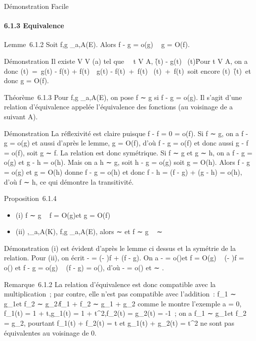 \documentclass[]{article}
\begin{document}
Démonstration Facile

\paragraph{6.1.3 Equivalence}

Lemme~6.1.2 Soit f,g _a,A(E). Alors f - g = o(g) \rigtharrow~ g = O(f).

Démonstration Il existe V \in V (a) tel que \forall~~t \in
V \bigcap A, \f(t) - g(t)\
 
\g(t)\. Pour t \in V \bigcap
A, on a donc \g(t)\
=(t) - f(t) + f(t)\
\leq{}(t) - f(t)\
+\ f(t)\ 
\over 2
\g(t)\
+\ f(t)\ soit encore
\g(t)\ \f(t)\, et donc g =
O(f).

Théorème~6.1.3 Pour f,g _a,A(E), on pose f ∼ g si f - g =
o(g). Il s'agit d'une relation d'équivalence appelée l'équivalence des
fonctions (au voisinage de a suivant A).

Démonstration La réflexivité est claire puisque f - f = 0 = o(f). Si f ∼
g, on a f - g = o(g) et aussi d'après le lemme, g = O(f), d'où f - g =
o(f) et donc aussi g - f = o(f), soit g ∼ f. La relation est donc
symétrique. Si f ∼ g et g ∼ h, on a f - g = o(g) et g - h = o(h). Mais
on a h ∼ g, soit h - g = o(g) soit g = O(h). Alors f - g = o(g) et g =
O(h) donne f - g = o(h) et donc f - h = (f - g) + (g - h) = o(h), d'où f
∼ h, ce qui démontre la transitivité.

Proposition~6.1.4

\begin{itemize}
\itemsep1pt\parskip0pt\parsep0pt
\item
  (i) f ∼ g \rigtharrow~ f = O(g)\text et g = O(f)
\item
  (ii) \phi,\psi {}_a,A(K), f,g _a,A(E), alors \phi ∼
  \psi\text et f ∼ g \rigtharrow~ \phif ∼ \psig
\end{itemize}

Démonstration (i) est évident d'après le lemme ci dessus et la symétrie
de la relation. Pour (ii), on écrit \phif - \psig = (\phi - \psi)f + \psi(f - g). On a
\phi - \psi = o(\psi)\text et f = O(g) \rigtharrow~ (\phi - \psi)f = o(\psig) et f
- g = o(g) \rigtharrow~ \psi(f - g) = o(\psig), d'où \phif - \psig = o(\psig) et \phif ∼ \psig.

Remarque~6.1.2 La relation d'équivalence est donc compatible avec la
multiplication~; par contre, elle n'est pas compatible avec l'addition~:
f_1 ∼ g_1\text et f_2 ∼
g_2\rigtharrow~̸f_1 + f_2 ∼ g_1 + g_2
comme le montre l'exemple a = 0, f_1(t) = 1 + t,g_1(t)
= 1 + t^2,f_2(t) = g_2(t) = -1~; on a
f_1 ∼ g_1\text et f_2 =
g_2, pourtant f_1(t) + f_2(t) = t et
g_1(t) + g_2(t) = t^2 ne sont pas
équivalentes au voisinage de 0.
\end{document}
